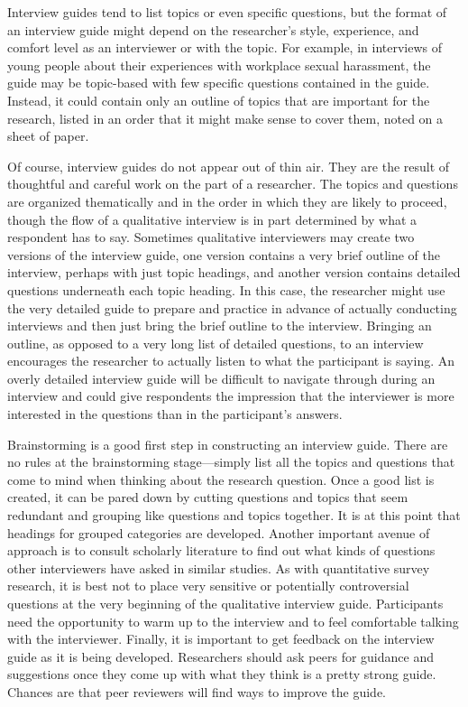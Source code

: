 Interview guides tend to list topics or even specific questions, but the format of an interview guide might depend on the researcher's style, experience, and comfort level as an interviewer or with the topic. For example, in interviews of young people about their experiences with workplace sexual harassment, the guide may be topic-based with few specific questions contained in the guide. Instead, it could contain only an outline of topics that are important for the research, listed in an order that it might make sense to cover them, noted on a sheet of paper.

Of course, interview guides do not appear out of thin air. They are the result of thoughtful and careful work on the part of a researcher. The topics and questions are organized thematically and in the order in which they are likely to proceed, though the flow of a qualitative interview is in part determined by what a respondent has to say. Sometimes qualitative interviewers may create two versions of the interview guide, one version contains a very brief outline of the interview, perhaps with just topic headings, and another version contains detailed questions underneath each topic heading. In this case, the researcher might use the very detailed guide to prepare and practice in advance of actually conducting interviews and then just bring the brief outline to the interview. Bringing an outline, as opposed to a very long list of detailed questions, to an interview encourages the researcher to actually listen to what the participant is saying. An overly detailed interview guide will be difficult to navigate through during an interview and could give respondents the impression that the interviewer is more interested in the questions than in the participant's answers.

Brainstorming is a good first step in constructing an interview guide. There are no rules at the brainstorming stage---simply list all the topics and questions that come to mind when thinking about the research question. Once a good list is created, it can be pared down by cutting questions and topics that seem redundant and grouping like questions and topics together. It is at this point that headings for grouped categories are developed. Another important avenue of approach is to consult scholarly literature to find out what kinds of questions other interviewers have asked in similar studies. As with quantitative survey research, it is best not to place very sensitive or potentially controversial questions at the very beginning of the qualitative interview guide. Participants need the opportunity to warm up to the interview and to feel comfortable talking with the interviewer. Finally, it is important to get feedback on the interview guide as it is being developed. Researchers should ask peers for guidance and suggestions once they come up with what they think is a pretty strong guide. Chances are that peer reviewers will find ways to improve the guide.

